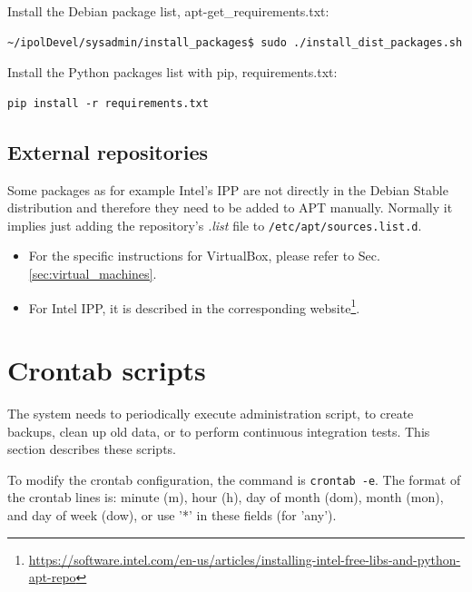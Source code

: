 \documentclass[a4paper,12pt]{article}
\begin{document}
Install the Debian package list, apt-get\_requirements.txt:
\begin{verbatim}
~/ipolDevel/sysadmin/install_packages$ sudo ./install_dist_packages.sh
\end{verbatim}

Install the Python packages list with pip, requirements.txt:
\begin{verbatim}
pip install -r requirements.txt
\end{verbatim}


\subsection{External repositories}
Some packages as for example Intel's IPP are not directly in the Debian Stable distribution and therefore they need to be added to APT manually. Normally it implies just adding the repository's \emph{.list} file to {\tt /etc/apt/sources.list.d}.

\begin{itemize}
    \item For the specific instructions for VirtualBox, please refer to Sec. \ref{sec:virtual_machines}.
    \item For Intel IPP, it is described in the corresponding website\footnote{\url{https://software.intel.com/en-us/articles/installing-intel-free-libs-and-python-apt-repo}}.
\end{itemize}


\section{Crontab scripts}
The system needs to periodically execute administration script, to create backups, clean up old data, or to perform continuous integration tests. This section describes these scripts.

To modify the crontab configuration, the command is {\tt crontab -e}. The format of the crontab lines is: minute (m), hour (h), day of month (dom), month (mon), and day of week (dow), or use '*' in these fields (for 'any').
\end{document}

